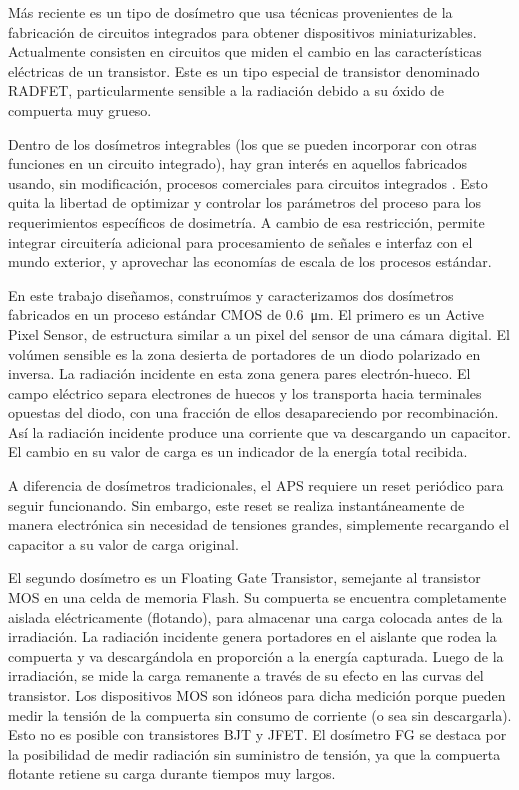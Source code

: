 Más reciente es un tipo de dosímetro que usa técnicas 
provenientes de la fabricación de circuitos integrados 
para obtener dispositivos 
miniaturizables\cite{holmes-siedle_radfet:_1986}.
Actualmente consisten en circuitos que miden el 
cambio en las características eléctricas de un transistor.
Este es un tipo especial de transistor denominado RADFET,
particularmente sensible a la radiación 
debido a su óxido de compuerta muy grueso.

Dentro de los dosímetros integrables 
(los que se pueden incorporar con otras funciones en un circuito integrado),
hay gran interés en aquellos fabricados usando, sin modificación,
procesos comerciales para circuitos integrados\cite{lipovetzky_field_2013}
\cite{wang_temperature_2005}
\cite{garcia-moreno_floating_2012}
\cite{dulinski_cmos_2004}.
Esto quita la libertad de optimizar y controlar 
los parámetros del proceso 
para los requerimientos específicos de dosimetría.
A cambio de esa restricción, 
permite integrar circuitería adicional
para procesamiento de señales e interfaz con el mundo exterior,
y aprovechar las economías de escala de los procesos estándar.

En este trabajo diseñamos, construímos y caracterizamos
dos dosímetros fabricados en un proceso estándar CMOS de
\SI{0.6}{\micro\meter}.
El primero es un Active Pixel Sensor,
de estructura similar a un pixel del sensor de una cámara digital.
El volúmen sensible es la zona desierta de portadores 
de un diodo polarizado en inversa.
La radiación incidente en esta zona genera pares electrón-hueco.
El campo eléctrico separa electrones de huecos y los transporta hacia
terminales opuestas del diodo,
con una fracción de ellos desapareciendo por recombinación.
Así la radiación incidente produce una corriente que va
descargando un capacitor.
El cambio en su valor de carga es un indicador de la energía total recibida.

A diferencia de dosímetros tradicionales,
el APS requiere un reset periódico para seguir funcionando.
Sin embargo, este reset se realiza
instantáneamente de manera electrónica sin necesidad de tensiones grandes,
simplemente recargando el capacitor a su valor de carga original.

El segundo dosímetro es un Floating Gate Transistor,
semejante al transistor MOS en una celda de memoria Flash.
Su compuerta se encuentra completamente aislada eléctricamente (flotando),
para almacenar una carga colocada antes de la irradiación.
La radiación incidente genera portadores en el aislante que rodea la compuerta
y va descargándola en proporción a la energía capturada.
Luego de la irradiación,
se mide la carga remanente a través de su efecto en las curvas del transistor.
Los dispositivos MOS son idóneos para dicha medición
porque pueden medir la tensión de la compuerta sin consumo de corriente
(o sea sin descargarla).
Esto no es posible con transistores BJT y JFET.
El dosímetro FG se destaca por la posibilidad de medir radiación sin suministro
de tensión, ya que la compuerta flotante retiene su carga durante tiempos muy
largos.


